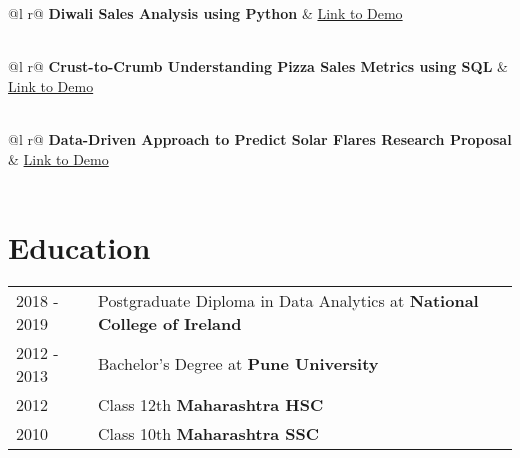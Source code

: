 \documentclass[a4paper,12pt]{article}
\begin{document}
\begin{tabularx}{\linewidth}{ @{}l r@{} }
\textbf{Diwali Sales Analysis using Python} & \hfill \href{https://github.com/AkshayBhujbal1995/Diwali-Sales-Analysis-using-Python/blob/main/Diwali_Sales_Analysis.ipynb}{Link to Demo} \\[3.75pt]
  \\
\end{tabularx}




\begin{tabularx}{\linewidth}{ @{}l r@{} }
\textbf{Crust-to-Crumb Understanding Pizza Sales Metrics using SQL} & \hfill \href{https://github.com/AkshayBhujbal1995/Crust-to-Crumb-Understanding-Pizza-Sales-Metrics-using-SQL}{Link to Demo} \\[3.75pt]
  \\
\end{tabularx}

\begin{tabularx}{\linewidth}{ @{}l r@{} }
\textbf{Data-Driven Approach to Predict Solar Flares Research Proposal} & \hfill \href{https://github.com/AkshayBhujbal1995/Data-Driven-Approach-to-Predict-Solar-Flares-Research-Proposal}{Link to Demo} \\[3.75pt]
  \\
\end{tabularx}


\section{Education}
\begin{tabularx}{\linewidth}{@{}l X@{}}	
2018 - 2019 &  Postgraduate Diploma in Data Analytics at \textbf{National College of Ireland} \hfill \normalsize  \\

2012 - 2013 & Bachelor's Degree at \textbf{Pune University} \hfill  \\ 

2012 & Class 12th \textbf{Maharashtra HSC} \hfill   \\

2010 & Class 10th \textbf{Maharashtra SSC} \hfill   \\
\end{tabularx}
\end{document}
